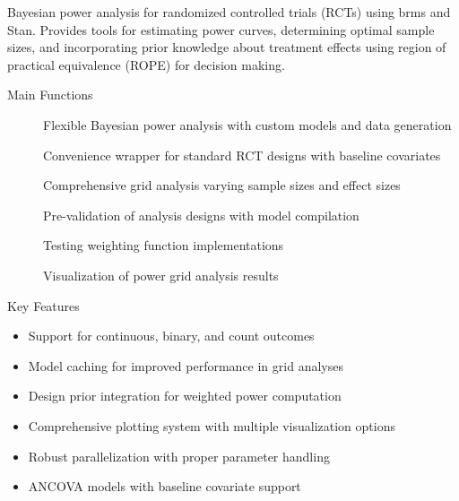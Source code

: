 \documentclass[letterpaper]{book}
\begin{document}
%
\begin{Description}
Bayesian power analysis for randomized controlled trials (RCTs) using brms and Stan.
Provides tools for estimating power curves, determining optimal sample sizes, and
incorporating prior knowledge about treatment effects using region of practical
equivalence (ROPE) for decision making.
\end{Description}
%
\begin{Section}{Main Functions}

\begin{description}

\item[] Flexible Bayesian power analysis with custom models and data generation
\item[] Convenience wrapper for standard RCT designs with baseline covariates
\item[] Comprehensive grid analysis varying sample sizes and effect sizes
\item[] Pre-validation of analysis designs with model compilation
\item[] Testing weighting function implementations
\item[] Visualization of power grid analysis results

\end{description}

\end{Section}
%
\begin{Section}{Key Features}

\begin{itemize}

\item{} Support for continuous, binary, and count outcomes
\item{} Model caching for improved performance in grid analyses
\item{} Design prior integration for weighted power computation
\item{} Comprehensive plotting system with multiple visualization options
\item{} Robust parallelization with proper parameter handling
\item{} ANCOVA models with baseline covariate support

\end{itemize}

\end{Section}
\end{document}

